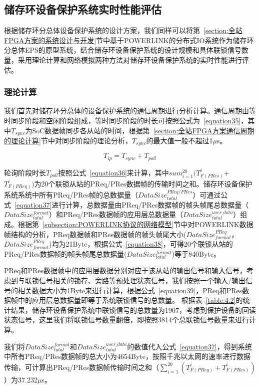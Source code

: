 \subsection{储存环设备保护系统实时性能评估}

根据储存环分总体设备保护系统的设计方案，我们同样可以将第~\ref{section:全站FPGA方案的系统设计与开发}节中基于POWERLINK的分布式IO系统作为储存环分总体EPS的原型系统，结合储存环设备保护系统的设计规模和具体联锁信号数量，采用理论计算和网络模拟两种方法对储存环设备保护系统的实时性能进行评估。

\subsubsection{理论计算}

我们首先对储存环分总体的设备保护系统的通信周期进行分析计算。通信周期由等时同步阶段和空闲阶段组成，等时同步阶段的时长可按照公式为~\ref{equation35}，其中$T_{sync}$为SoC数据帧同步各从站的时间，根据第~\ref{section:全站FPGA方案通信周期的理论计算}节中对同步阶段的理论分析，$T_{sync}$的最大值一般不超过1$\mu$s。

\begin{equation}
\label{equation35}
T_{ip}=T_{sync}+T_{poll}
\end{equation}

轮询阶段时长$T_{poll}$按照公式~\ref{equation36}来计算，其中$sum_{i=1}^{20}(T_{F(PRes)}^{i}$+$T_{F(PReq)}^{i})$为20个联锁从站的PReq/PRes数据帧的传输时间之和。储存环设备保护系统系统中所有PReq/PRes帧的总数据量（$DataSize_{total}^{PReq/PRes}$）可通过公式~\ref{equation37}进行计算，总数据量由PReq/PRes数据帧的帧头帧尾总数据量（$DataSize_{total}^{format}$）和PReq/PRes数据帧的应用层总数据量（$DataSize_{total}^{user\_data}$）组成。根据第~\ref{subsection:POWERLINK协议的网络模型}节中对POWERLINK数据帧结构的分析，PReq数据帧和PRes数据帧的帧头帧尾大小($DataSize_{format}^{PReq}$，$DataSize_{format}^{PReq}$)均为21Byte，根据公式~\ref{equation38}，可得20个联锁从站的PReq/PRes数据帧的帧头帧尾总数据量($DataSize_{total}^{format}$)等于840Byte。

PReq和PRes数据帧中的应用层数据分别对应于该从站的输出信号和输入信号，考虑到与联锁信号相关的锁存、旁路等预处理状态信号，我们按照一个输入/输出信号的相关数据大小为1Byte来进行计算，根据公式~\ref{equation39}，PReq和PRes数据帧中的应用层总数据量即等于系统联锁信号的总数量。
根据表~\ref{table:4.2}的统计结果，储存环设备保护系统中联锁信号的总数量为1907，考虑到保护设备的回读状态信号，这里我们将联锁信号数量翻倍，即按照3814个总联锁信号数量来进行计算。


我们将$DataSize_{total}^{format}$和$DataSize_{total}^{user\_data}$的数值代入公式~\ref{equation37}，得到系统中所有PReq/PRes数据帧的总大小为4654Byte，按照千兆以太网的速率进行数据传输，可计算出PReq/PRes数据帧传输时间之和（$\sum_{i=1}^{20}(T_{F(PReq)}^{i}+T_{F(PRes)}^{i})$）为37.232$\mu$s。


